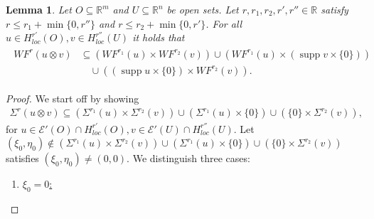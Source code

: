 \documentclass{amsart}
\newcommand{\supp}{\operatorname{supp}}
\newtheorem{lemma}[theorem]{Lemma}
\theoremstyle{definition}
\begin{document}
\begin{lemma}
\label{WF_tenz_proiz}
Let $O\subseteq \mathbb{R}^m$ and $U\subseteq \mathbb{R}^n$ be open sets. Let $r,r_1,r_2,r',r''\in\mathbb{R}$ satisfy $r \leq r_1 + \min \{0,r''\}$ and $r \leq r_2 + \min \{0,r'\}$. For all $u\in H_{loc} ^{r'} (O), v\in H_{loc} ^{r''} (U)$ it holds that
\begin{align}
\label{talsnifrontinkl}
\begin{split}
WF^r (u\otimes v)
&\subseteq (WF^{r_1} (u) \times WF^{r_2} (v)) \cup (WF^{r_1} (u) \times (\supp v \times \{0\})) \\
&\quad \cup ((\supp u \times \{0 \}) \times WF^{r_2} (v)).
\end{split}
\end{align}
\end{lemma}
\begin{proof}
We start off by showing
\begin{align}
\label{sigma}
\Sigma^r (u\otimes v)
\subseteq
(\Sigma^{r_1} (u) \times \Sigma^{r_2} (v)) \cup (\Sigma^{r_1} (u) \times \{0\}) \cup (\{0\} \times \Sigma^{r_2} (v)),
\end{align}
for $u\in \mathcal{E}' (O) \cap H_{loc} ^{r'} (O) , v\in \mathcal{E}' (U) \cap H_{loc} ^{r''} (U)$. Let $(\xi_0,\eta_0)\notin (\Sigma^{r_1} (u) \times \Sigma^{r_2} (v)) \cup (\Sigma^{r_1} (u) \times \{0\}) \cup (\{0\} \times \Sigma^{r_2} (v))$ satisfies $(\xi_0,\eta_0)\neq (0,0)$. We distinguish three cases:
\begin{enumerate}
\item \underline{$\xi_0 = 0$:}


\end{enumerate}
\end{proof}
\end{document}
